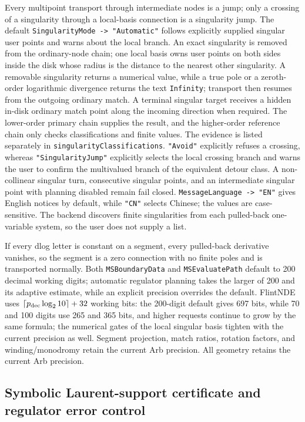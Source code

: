 \documentclass[11pt,a4paper]{article}
\begin{document}
Every multipoint transport through intermediate nodes is a jump; only a crossing of a
singularity through a local-basis connection is a singularity jump.  The default
\texttt{SingularityMode -> "Automatic"} follows explicitly supplied singular user points and
warns about the local branch.  An exact singularity is removed from the ordinary-node chain;
one local basis owns user points on both sides inside the disk whose radius is the distance to
the nearest other singularity.  A removable singularity returns a numerical value, while a true
pole or a zeroth-order logarithmic divergence returns the text \texttt{Infinity}; transport then
resumes from the outgoing ordinary match.  A terminal singular target receives a hidden in-disk
ordinary match point along the incoming direction when required.  The lower-order primary chain
supplies the result, and the higher-order reference chain only checks classifications and finite
values.  The evidence is listed separately in \texttt{singularityClassifications}.
\texttt{"Avoid"} explicitly refuses a crossing, whereas \texttt{"SingularityJump"} explicitly
selects the local crossing branch and warns the user to confirm the multivalued branch of the
equivalent detour class.  A non-collinear singular turn, consecutive singular points, and an
intermediate singular point with planning disabled remain fail closed.
\texttt{MessageLanguage -> "EN"} gives English notices by default, while
\texttt{"CN"} selects Chinese; the values are case-sensitive. The backend discovers finite
singularities from each pulled-back one-variable system, so the user does not supply a list.

If every dlog letter is constant on a segment, every pulled-back derivative vanishes, so the
segment is a zero connection with no finite poles and is transported normally. Both
\texttt{MSBoundaryData} and \texttt{MSEvaluatePath} default to 200 decimal working digits;
automatic regulator planning takes the larger of 200 and its adaptive estimate, while an explicit
precision overrides the default. FlintNDE uses $\lceil p_{\rm dec}\log_2 10\rceil+32$ working
bits: the 200-digit default gives 697 bits, while 70 and 100 digits use 265 and
365 bits, and higher requests continue to grow by the same formula; the numerical gates of
the local singular basis tighten with the current precision as well. Segment projection,
match ratios, rotation factors, and winding/monodromy retain the current Arb precision.
All geometry retains the current Arb precision.

\subsection{Symbolic Laurent-support certificate and regulator error control}
\label{sec:regulator-certificate}
\end{document}
